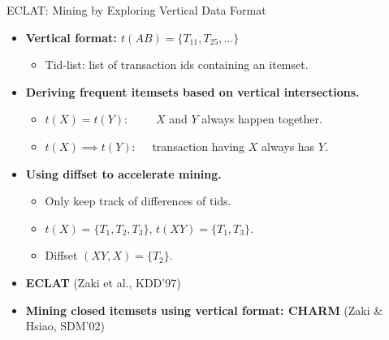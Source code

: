 \begin{frame}{ECLAT: Mining by Exploring Vertical Data Format}
	\begin{itemize}
		\item \textbf{Vertical format: $t(AB) = \{T_{11},T_{25},\ldots\}$}
		\begin{itemize}
			\item Tid-list: list of transaction ids containing an itemset.
		\end{itemize}
		\item \textbf{Deriving frequent itemsets based on vertical 
		intersections.}
		\begin{itemize}
			\item $t(X) = t(Y): \qquad$ \hphantom{.} $X$ and $Y$ always happen 
			together.
			\item $t(X) \implies t(Y):\quad $ transaction having $X$ always has 
			$Y$.
		\end{itemize}
		\item \textbf{Using diffset to accelerate mining.}
		\begin{itemize}
			\item Only keep track of differences of tids.
			\item $t(X) = \{T_1,T_2,T_3\}$, $t(XY) = \{T_1,T_3\}$.
			\item Diffset $(XY,X) = \{T_2\}$.
		\end{itemize}
		\item \textbf{ECLAT} (Zaki et al., KDD'97)
		\item \textbf{Mining closed itemsets using vertical format: CHARM} 
		(Zaki \& Hsiao, SDM'02)
	\end{itemize}
\end{frame}

